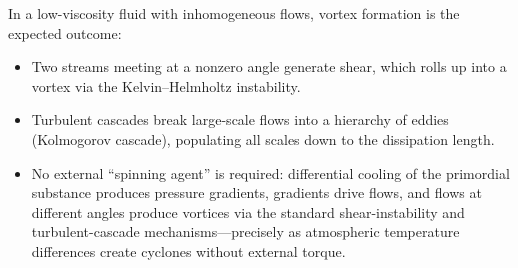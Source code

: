 \documentclass[11pt]{article}
\begin{document}
In a low-viscosity fluid with inhomogeneous flows, vortex formation is
the expected outcome:
\begin{itemize}
  \item Two streams meeting at a nonzero angle generate shear, which
    rolls up into a vortex via the Kelvin--Helmholtz instability.
  \item Turbulent cascades break large-scale flows into a hierarchy
    of eddies (Kolmogorov cascade), populating all scales down to the
    dissipation length.
  \item No external ``spinning agent'' is required: differential
    cooling of the primordial substance produces pressure gradients,
    gradients drive flows, and flows at different angles produce
    vortices via the standard shear-instability and turbulent-cascade
    mechanisms---precisely as atmospheric temperature differences
    create cyclones without external torque.
\end{itemize}
\end{document}
